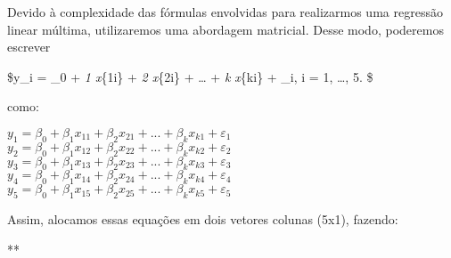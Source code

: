 \documentclass[
]{article}
\newenvironment{Shaded}{\begin{snugshade}}{\end{snugshade}}
\newcommand{\DataTypeTok}[1]{\textcolor[rgb]{0.13,0.29,0.53}{#1}}
\newcommand{\DecValTok}[1]{\textcolor[rgb]{0.00,0.00,0.81}{#1}}
\newcommand{\KeywordTok}[1]{\textcolor[rgb]{0.13,0.29,0.53}{\textbf{#1}}}
\newcommand{\NormalTok}[1]{#1}
\newcommand{\OperatorTok}[1]{\textcolor[rgb]{0.81,0.36,0.00}{\textbf{#1}}}
\newcommand{\OtherTok}[1]{\textcolor[rgb]{0.56,0.35,0.01}{#1}}
\newcommand{\StringTok}[1]{\textcolor[rgb]{0.31,0.60,0.02}{#1}}
\begin{document}
Devido à complexidade das fórmulas envolvidas para realizarmos uma
regressão linear múltima, utilizaremos uma abordagem matricial. Desse
modo, poderemos escrever

\$y\_i = \beta\_0 + \beta\emph{1 x}\{1i\} + \beta\emph{2 x}\{2i\} +
\ldots{} + \beta\emph{k x}\{ki\} + \varepsilon\_i, i = 1, \ldots, 5. \$

como:

\(y_1 = \beta_0 + \beta_1 x_{11} + \beta_2 x_{21} + ... + \beta_k x_{k1} + \varepsilon_1\)
\(y_2 = \beta_0 + \beta_1 x_{12} + \beta_2 x_{22} + ... + \beta_k x_{k2} + \varepsilon_2\)
\(y_3 = \beta_0 + \beta_1 x_{13} + \beta_2 x_{23} + ... + \beta_k x_{k3} + \varepsilon_3\)
\(y_4 = \beta_0 + \beta_1 x_{14} + \beta_2 x_{24} + ... + \beta_k x_{k4} + \varepsilon_4\)
\(y_5 = \beta_0 + \beta_1 x_{15} + \beta_2 x_{25} + ... + \beta_k x_{k5} + \varepsilon_5\)

Assim, alocamos essas equações em dois vetores colunas (5x1), fazendo:

\begin{Shaded}
\end{Shaded}

**
\end{document}
